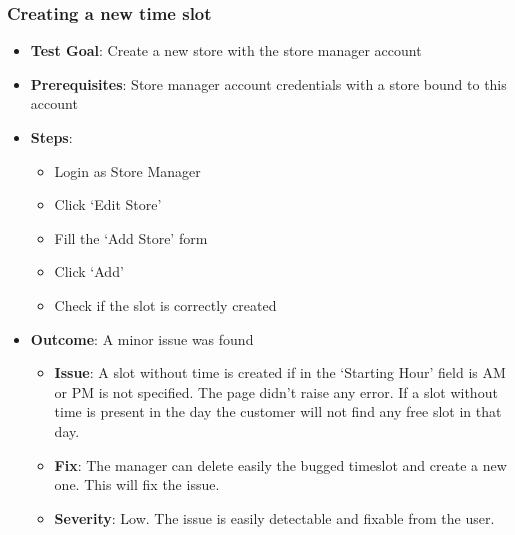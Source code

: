 \subsubsection{Creating a new time slot}
\begin{itemize}
    \item \textbf{Test Goal}: Create a new store with the store manager account
    \item \textbf{Prerequisites}: Store manager account credentials with a store bound to this account
    \item \textbf{Steps}:
          \begin{itemize}
              \item Login as Store Manager
              \item Click `Edit Store'
              \item Fill the `Add Store' form
              \item Click `Add'
              \item Check if the slot is correctly created
          \end{itemize}
    \item \textbf{Outcome}:  A minor issue was found
          \begin{itemize}
              \item \textbf{Issue}: A slot without time is created if in the `Starting Hour' field is AM or PM is not specified. The page didn't raise any error.
                    If a slot without time is present in the day the customer will not find any free slot in that day.
              \item \textbf{Fix}: The manager can delete easily the bugged timeslot and create a new one. This will fix the issue.
              \item \textbf{Severity}: Low. The issue is easily detectable and fixable from the user.
          \end{itemize}
\end{itemize}
